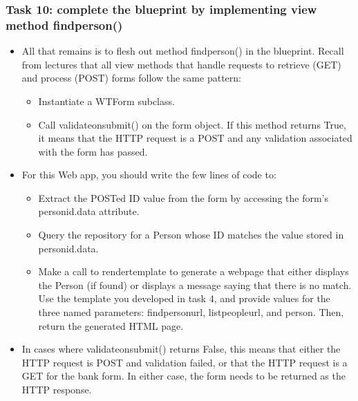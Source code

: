 \documentclass{beamer}
\begin{document}
	\begin{frame}
		\frametitle{Task 10: complete the blueprint by implementing view method find\textunderscore{}person()}
		\begin{itemize}
			\item All that remains is to flesh out method find\textunderscore{}person() in the blueprint. Recall from lectures that all view methods that handle requests to retrieve (GET) and process (POST) forms follow the same pattern:
            \begin{itemize}
                \item Instantiate a WTForm subclass.
                \item Call validate\textunderscore{}on\textunderscore{}submit() on the form object. If this method returns True, it means that the HTTP request is a POST and any validation associated with the form has passed.
            \end{itemize}
    	\end{itemize}
	\end{frame}

	\begin{frame}
	    \begin{itemize}
            \item For this Web app, you should write the few lines of code to:
            \begin{itemize}
                \item Extract the POSTed ID value from the form by accessing the form’s person\textunderscore{}id.data attribute.
                \item Query the repository for a Person whose ID matches the value stored in person\textunderscore{}id.data.
                \item Make a call to render\textunderscore{}template to generate a webpage that either displays the Person (if found) or displays a message saying that there is no match. Use the template you developed in task 4, and provide values for the three named parameters: find\textunderscore{}person\textunderscore{}url, list\textunderscore{}people\textunderscore{}url, and person. Then, return the generated HTML page.
            \end{itemize}
            \item In cases where validate\textunderscore{}on\textunderscore{}submit() returns False, this means that either the HTTP request is POST and validation failed, or that the HTTP request is a GET for the bank form. In either case, the form needs to be returned as the HTTP response.
        \end{itemize}
	\end{frame}
\end{document}

